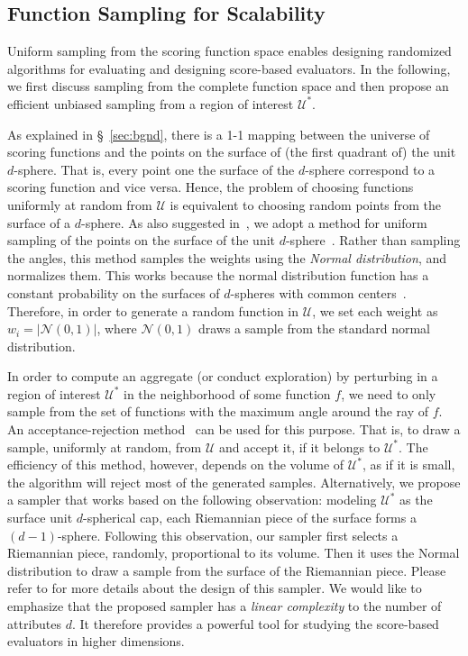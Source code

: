 \subsection{Function Sampling for Scalability}\label{sec:sampling} %

Uniform sampling from the scoring function space enables designing randomized algorithms for evaluating and designing score-based evaluators.
In the following, we first discuss sampling from the complete function space and then propose an efficient unbiased sampling from a region of interest $\mathcal{U}^*$.

As explained in \S~\ref{sec:bgnd}, there is a 1-1 mapping between the universe of scoring functions and the points on the surface of (the first quadrant of) the unit $d$-sphere. That is, every point one the surface of the $d$-sphere correspond to a scoring function and vice versa.
Hence, the problem of choosing functions uniformly at random from $\mathcal{U}$ is equivalent to choosing random points from the surface of a $d$-sphere.
As also suggested in~\cite{rrr}, we adopt a method for uniform sampling of the points on the surface of the unit $d$-sphere~\cite{muller1959note, marsaglia1972choosing}.
Rather than sampling the angles, this method samples the weights using the {\em Normal distribution}, and normalizes them. 
This works because the normal distribution function has a constant probability on the surfaces of $d$-spheres with common centers~\cite{marsaglia1972choosing}.
Therefore, in order to generate a random function in $\mathcal{U}$, we set each weight as $w_i = |\mathcal{N}(0,1)|$, where $\mathcal{N}(0,1)$ draws a sample from the standard normal distribution.

In order to compute an aggregate (or conduct exploration) by perturbing in a region of interest $\mathcal{U}^*$ in the neighborhood of some function $f$, we need to only sample from the set of functions with the maximum angle around the ray of $f$.
An acceptance-rejection method~\cite{lucidl1989random} can be used for this purpose. That is, to draw a sample, uniformly at random, from $\mathcal{U}$ and accept it, if it belongs to $\mathcal{U}^*$.
The efficiency of this method, however, depends on the volume of $\mathcal{U}^*$, as if it is small, the algorithm will reject most of the generated samples.
Alternatively, we propose a sampler that works based on the following observation:
modeling $\mathcal{U}^*$ as the surface unit $d$-spherical cap, each Riemannian piece of the surface forms a $(d-1)$-sphere.
Following this observation, our sampler first selects a  Riemannian piece, randomly, proportional to its volume. Then it uses the Normal distribution to draw a sample from the surface of the Riemannian piece. 
Please refer to \cite{asudeh2018obtaining} for more details about the design of this sampler.
We would like to emphasize that the proposed sampler has a {\em linear complexity} to the number of attributes $d$. It therefore provides a powerful tool for studying the score-based evaluators in higher dimensions.

